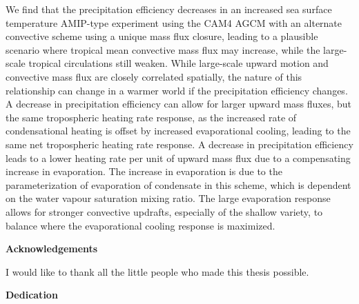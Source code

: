 We find that the precipitation efficiency decreases in an increased sea surface temperature AMIP-type experiment using the CAM4 AGCM with an alternate convective scheme using a unique mass flux closure, leading to a plausible scenario where tropical mean convective mass flux may increase, while the large-scale tropical circulations still weaken. While large-scale upward motion and convective mass flux are closely correlated spatially, the nature of this relationship can change in a warmer world if the precipitation efficiency changes. A decrease in precipitation efficiency can allow for larger upward mass fluxes, but the same tropospheric heating rate response, as the increased rate of condensational heating is offset by increased evaporational cooling, leading to the same net tropospheric heating rate response. A decrease in precipitation efficiency leads to a lower heating rate per unit of upward mass flux due to a compensating increase in evaporation. The increase in evaporation is due to the parameterization of evaporation of condensate in this scheme, which is dependent on the water vapour saturation mixing ratio. The large evaporation response allows for stronger convective updrafts, especially of the shallow variety, to balance where the evaporational cooling response is maximized. 
\cleardoublepage


\begin{center}\textbf{Acknowledgements}\end{center}

I would like to thank all the little people who made this thesis possible.
\cleardoublepage


\begin{center}\textbf{Dedication}\end{center}

\cleardoublepage

\renewcommand\contentsname{Table of Contents}
\tableofcontents
\cleardoublepage
{}    %

\listoftables
\cleardoublepage
{}		%

\listoffigures
\cleardoublepage
{}		%

\cleardoublepage
{}		%


